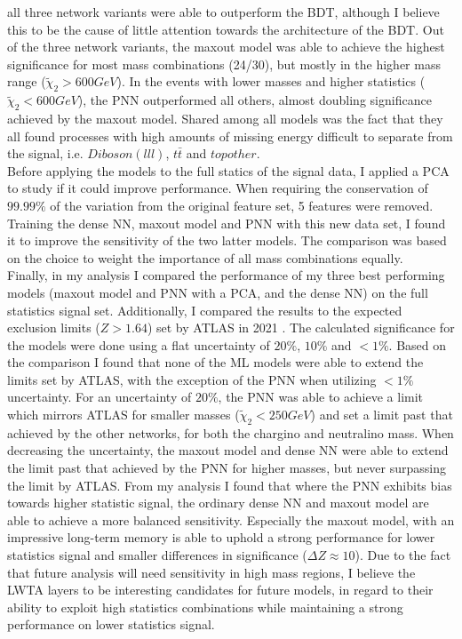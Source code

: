 all three network variants were able to outperform the \ac{BDT}, although I believe this to be the cause of little attention towards the architecture of the \ac{BDT}. Out of the three network variants, the maxout model was able to achieve 
the highest significance for most mass combinations (24/30), but mostly in the higher mass range ($\tilde{\chi}_2>600GeV$). In the events with lower masses and higher statistics ($\tilde{\chi}_2<600GeV$), the \ac{PNN} outperformed all others, 
almost doubling significance achieved by the maxout model. Shared among all models was the fact that they all found processes with high amounts of missing energy difficult to separate from the signal, i.e. $Diboson(lll)$, $t\bar{t}$ and $top other$.
\\
Before applying the models to the full statics of the signal data, I applied a \ac{PCA} to study if it could improve performance. When requiring the conservation of $99.99\%$ of the variation from the original feature set, 5 features were removed.
Training the dense \ac{NN}, maxout model and \ac{PNN} with this new data set, I found it to improve the sensitivity of the two latter models. The comparison was based on the choice to weight the importance of all mass combinations equally.
\\
Finally, in my analysis I compared the performance of my three best performing models (maxout model and \ac{PNN} with a \ac{PCA}, and the dense \ac{NN}) on the full statistics signal set. Additionally, I compared the results to the expected exclusion 
limits ($Z>1.64$) set by \ac{ATLAS} in 2021 \cite{atlas_search_2021}. The calculated significance for the models were done using a flat uncertainty of $20\%$, $10\%$ and $<1\%$. Based on the comparison I found that none of the \ac{ML} models were 
able to extend the limits set by \ac{ATLAS}, with the exception of the \ac{PNN} when utilizing $<1\%$ uncertainty. For an uncertainty of $20\%$, the \ac{PNN} was able to achieve a limit which mirrors \ac{ATLAS} for smaller masses ($\tilde{\chi}_2<250GeV$)
and set a limit past that achieved by the other networks, for both the chargino and neutralino mass. When decreasing the uncertainty, the maxout model and dense \ac{NN} were able to extend the limit past that achieved by the \ac{PNN} for higher masses, 
but never surpassing the limit by \ac{ATLAS}. From my analysis I found that where the \ac{PNN} exhibits bias towards higher statistic signal, the ordinary dense \ac{NN} and maxout model are able to achieve a more balanced sensitivity. Especially the 
maxout model, with an impressive long-term memory is able to uphold a strong performance for lower statistics signal and smaller differences in significance ($\Delta Z \approx 10$). Due to the fact that future analysis will need sensitivity in high mass regions, 
I believe the \ac{LWTA} layers to be interesting candidates for future models, in regard to their ability to exploit high statistics combinations while maintaining a strong performance on lower statistics signal. 

